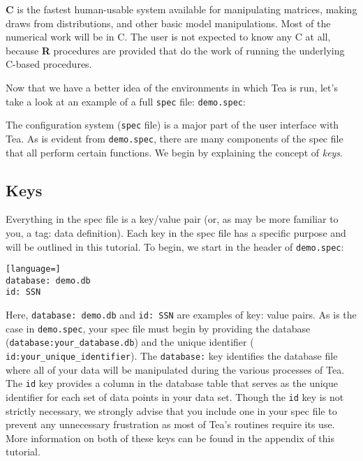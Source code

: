 \documentclass{article}
\begin{document}
{\bf C} is the fastest human-usable system available for manipulating matrices, making
draws from distributions, and other basic model manipulations. Most of the numerical
work will be in C. The user is not expected to know any C at all, because \textbf{R}
procedures are provided that do the work of running the underlying C-based procedures.

Now that we have a better idea of the environments in which Tea is run, let's take a look  
at an example of a full {\tt spec} file: {\tt demo.spec}:


%


The configuration system ({\tt spec} file) is a major part of the user interface with Tea. 
As is evident from {\tt demo.spec}, there are many components of the spec file that all 
perform certain functions. We begin by explaining the concept of \textit{keys}.

\subsection{Keys}
Everything in the spec file is a key/value pair (or, as may be more familiar to 
you, a tag: data definition). Each key in the spec file has a specific purpose and 
will be outlined in this tutorial.
To begin, we start in the header of {\tt demo.spec}:

\begin{lstlisting}[language=]
database: demo.db
id: SSN
\end{lstlisting}

Here, {\tt database: demo.db} and {\tt id: SSN} are examples of key: value pairs.
As is the case in {\tt demo.spec}, your spec file must begin by providing the
database ({\tt database:your\_database.db}) and the unique identifier ({\tt
id:your\_unique\_identifier}). The {\tt database:} key identifies the database file
where all of your data will be manipulated during the various processes of Tea.
The {\tt id} key provides a column in the database table that serves as the unique
identifier for each set of data points in your data set. Though the {\tt id} key is
not strictly necessary, we strongly advise that you include one in your spec file to
prevent any unnecessary frustration as most of Tea's routines require its use. More
information on both of these keys can be found in the appendix of this tutorial.\\
\end{document}
